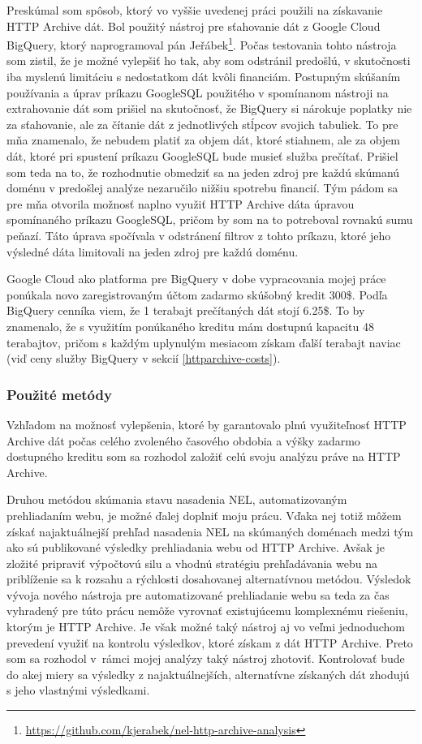 Preskúmal som spôsob, ktorý vo vyššie uvedenej práci použili na získavanie HTTP Archive dát.
Bol použitý nástroj pre sťahovanie dát z Google Cloud BigQuery, ktorý naprogramoval pán 
Jeřábek\footnote{\url{https://github.com/kjerabek/nel-http-archive-analysis}}.
Počas testovania tohto nástroja som zistil, že je možné vylepšiť ho tak, aby som odstránil predošlú, v skutočnosti iba myslenú limitáciu s nedostatkom dát kvôli financiám.
Postupným skúšaním používania a úprav príkazu GoogleSQL použitého v spomínanom nástroji na extrahovanie dát som prišiel na skutočnosť, že BigQuery
si nárokuje poplatky nie za sťahovanie, ale za čítanie dát z jednotlivých stĺpcov svojich tabuliek.
To pre mňa znamenalo, že nebudem platiť za objem dát, ktoré stiahnem, ale za objem dát, ktoré pri spustení príkazu GoogleSQL bude musieť služba prečítať.
Prišiel som teda na to, že rozhodnutie obmedziť sa na jeden zdroj pre každú skúmanú doménu v predošlej analýze nezaručilo nižšiu spotrebu financií.
Tým pádom sa pre mňa otvorila možnosť naplno využiť HTTP Archive dáta úpravou spomínaného príkazu GoogleSQL, pričom by som na to potreboval rovnakú sumu peňazí.
Táto úprava spočívala v odstránení filtrov z tohto príkazu, ktoré jeho výsledné dáta limitovali na jeden zdroj pre každú doménu.

Google Cloud ako platforma pre BigQuery v dobe vypracovania mojej práce ponúkala novo zaregistrovaným účtom zadarmo skúšobný
kredit 300\$. 
Podľa BigQuery cenníka viem, že 1 terabajt prečítaných dát stojí 6.25\$.
To by znamenalo, že s využitím ponúkaného kreditu mám dostupnú kapacitu 48 terabajtov, 
pričom s každým uplynulým mesiacom získam ďalší terabajt naviac (viď ceny služby BigQuery v sekcií \ref{httparchive-costs}).

\subsubsection{Použité metódy}

Vzhľadom na možnosť vylepšenia, ktoré by garantovalo plnú využiteľnosť HTTP Archive dát počas celého zvoleného časového obdobia a výšky zadarmo dostupného kreditu
som sa rozhodol založiť celú svoju analýzu práve na HTTP Archive.

Druhou metódou skúmania stavu nasadenia NEL, automatizovaným prehliadaním webu, je možné ďalej doplniť moju prácu.
Vďaka nej totiž môžem získať najaktuálnejší prehľad nasadenia NEL na skúmaných doménach medzi tým ako sú publikované výsledky prehliadania webu od HTTP Archive.
Avšak je zložité pripraviť výpočtovú silu a vhodnú stratégiu prehľadávania webu na priblíženie sa k rozsahu a rýchlosti dosahovanej alternatívnou metódou.
Výsledok vývoja nového nástroja pre automatizované prehliadanie webu sa teda za čas vyhradený pre túto prácu nemôže vyrovnať existujúcemu komplexnému riešeniu, ktorým je HTTP Archive.
Je však možné taký nástroj aj vo veľmi jednoduchom prevedení využiť na kontrolu výsledkov, ktoré získam z dát HTTP Archive.
Preto som sa rozhodol \mbox{v rámci} mojej analýzy taký nástroj zhotoviť.
Kontrolovať bude do akej miery sa výsledky z najaktuálnejších, alternatívne získaných dát zhodujú s jeho vlastnými výsledkami.

